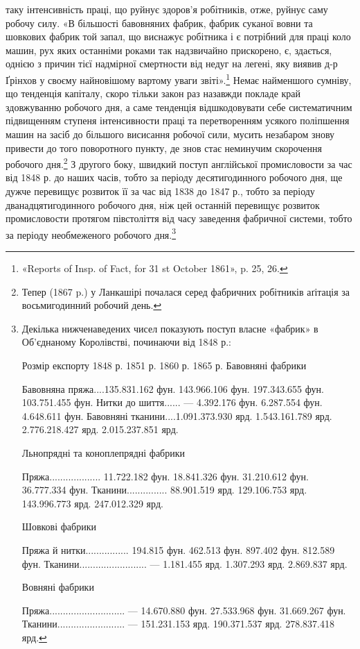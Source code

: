 таку інтенсивність праці, що руйнує здоров’я робітників, отже,
руйнує саму робочу силу. «В більшості бавовняних фабрик, фабрик
суканої вовни та шовкових фабрик той запал, що виснажує
робітника і є потрібний для праці коло машин, рух яких останніми
роками так надзвичайно прискорено, є, здається, однією
з причин тієї надмірної смертности від недуг на легені, яку виявив
д-р Ґрінхов у своєму найновішому вартому уваги звіті».\footnote{
«Reports of Insp. of Fact, for 31 st October 1861», p. 25, 26.
}
Немає найменшого сумніву, що тенденція капіталу, скоро тільки
закон раз назавжди покладе край здовжуванню робочого дня,
а саме тенденція відшкодовувати себе систематичним підвищенням
ступеня інтенсивности праці та перетворенням усякого поліпшення
машин на засіб до більшого висисання робочої сили, мусить
незабаром знову привести до того поворотного пункту, де знов
стає неминучим скорочення робочого дня.\footnote{
Тепер (1867 p.) у Ланкашірі почалася серед фабричних робітників
аґітація за восьмигодинний робочий день.
} З другого боку,
швидкий поступ англійської промисловости за час від 1848 р. до
наших часів, тобто за періоду десятигодинного робочого дня, ще
дужче перевищує розвиток її за час від 1838 до 1847 р., тобто за
періоду дванадцятигодинного робочого дня, ніж цей останній
перевищує розвиток промисловости протягом півстоліття від часу
заведення фабричної системи, тобто за періоду необмеженого
робочого дня.\footnote{
Декілька нижченаведених чисел показують поступ власне «фабрик»
в Об’єднаному Королівстві, починаючи від 1848 р.:

                                                                                        Розмір
експорту
                                                             1848 р.               1851 р.          
        1860 р.                 1865 р.
Бавовняні фабрики

Бавовняна пряжа....135.831.162 фун.   143.966.106 фун.  197.343.655 фун. 103.751.455 фун.
Нитки до шиття......                      —                 4.392.176 фун.    6.287.554 фун.   
4.648.611 фун.
Бавовняні тканини....1.091.373.930 ярд.  1.543.161.789 ярд.    2.776.218.427 ярд.    2.015.237.851
ярд.

Льнопрядні та коноплепрядні фабрики

Пряжа...................  11.722.182 фун.    18.841.326 фун.    31.210.612 фун.    36.777.334 фун.
Тканини...............  88.901.519 ярд.    129.106.753 ярд.    143.996.773 ярд.    247.012.329 ярд.

Шовкові фабрики

Пряжа й нитки................  194.815 фун.    462.513 фун.      897.402 фун.         812.589 фун.
Тканини.........................              —             1.181.455 ярд.    1.307.293 ярд.   
2.869.837 ярд.

Вовняні фабрики

Пряжа............................               —       14.670.880 фун.    27.533.968 фун.   
31.669.267 фун.
Тканини.........................              —     151.231.153 ярд.    190.371.537 ярд.   
278.837.418 ярд.
}